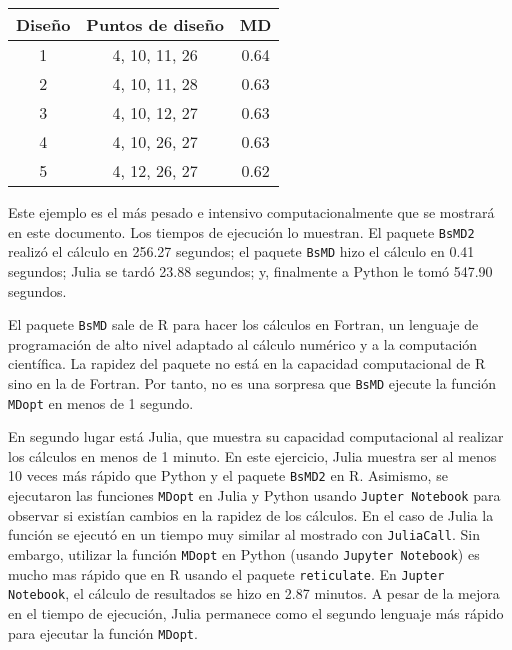 \begin{center}
	\begin{tabular}{cc|c}
		Diseño & Puntos de diseño & MD \\
		\hline
		1 & 4, 10, 11, 26 & 0.64 \\
		
		2 & 4, 10, 11, 28 & 0.63 \\
		
		3 & 4, 10, 12, 27 & 0.63 \\
		
		4 & 4, 10, 26, 27 & 0.63 \\
		
		5 & 4, 12, 26, 27 & 0.62 \\
		
	\end{tabular}
	 \label{results_ej2}
\end{center}

Este ejemplo es el más pesado e intensivo computacionalmente que se mostrará en este documento. Los tiempos de ejecución lo muestran. El paquete \texttt{BsMD2} realizó el cálculo en 256.27 segundos; el paquete \texttt{BsMD} hizo el cálculo en 0.41 segundos; Julia se tardó 23.88 segundos; y, finalmente a Python le tomó 547.90 segundos.

El paquete \texttt{BsMD} sale de \textsf{R} para hacer los cálculos en \textsf{Fortran}, un lenguaje de programación de alto nivel adaptado al cálculo numérico y a la computación científica. La rapidez del paquete no está en la capacidad computacional de \textsf{R} sino en la de \textsf{Fortran}. Por tanto, no es una sorpresa que \texttt{BsMD} ejecute la función \texttt{MDopt} en menos de 1 segundo. 

En segundo lugar está \textsf{Julia}, que muestra su capacidad computacional al realizar los cálculos en menos de 1 minuto. En este ejercicio, \textsf{Julia} muestra ser al menos 10 veces más rápido que \textsf{Python} y el paquete \texttt{BsMD2} en \textsf{R}. Asimismo, se ejecutaron las funciones \texttt{MDopt} en \textsf{Julia} y \textsf{Python} usando \texttt{Jupter Notebook} para observar si existían cambios en la rapidez de los cálculos. En el caso de \textsf{Julia} la función se ejecutó en un tiempo muy similar al mostrado con \texttt{JuliaCall}. Sin embargo, utilizar la función \texttt{MDopt} en \textsf{Python} (usando \texttt{Jupyter Notebook}) es mucho mas rápido que en \textsf{R} usando el paquete \texttt{reticulate}. En \texttt{Jupter Notebook}, el cálculo de resultados se hizo en 2.87 minutos. A pesar de la mejora en el tiempo de ejecución, \textsf{Julia} permanece como el segundo lenguaje más rápido para ejecutar la función \texttt{MDopt}. 

